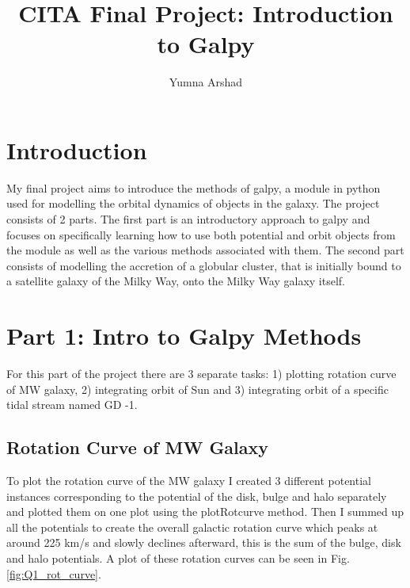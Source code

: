 \documentclass[apj]{emulateapj}
\begin{document}
\title{CITA Final Project: Introduction to Galpy}
 
\author{Yumna Arshad}
 
\section{Introduction}
My final project aims to introduce the methods of galpy, a module in python used for modelling the orbital dynamics of objects in the galaxy. 
The project consists of 2 parts. 
The first part is an introductory approach to galpy and focuses on specifically learning how to use both potential and orbit objects from the module as well as the various methods associated with them.
The second part consists of modelling the accretion of a globular cluster, that is initially bound to a satellite galaxy of the Milky Way, onto the Milky Way galaxy itself. 


\section{Part 1: Intro to Galpy Methods}

For this part of the project there are 3 separate tasks: 1) plotting rotation curve of MW galaxy, 2) integrating orbit of Sun and 3) integrating orbit of a specific tidal stream named GD -1.


\subsection{Rotation Curve of MW Galaxy}
To plot the rotation curve of the MW galaxy I created 3 different potential instances corresponding to the potential of the disk, bulge and halo separately and plotted them on one plot using the plotRotcurve method. Then I summed up all the potentials to create the overall galactic rotation curve which peaks at around 225 km/s and slowly declines afterward, this is the sum of the bulge, disk and halo potentials.
A plot of these rotation curves can be seen in Fig.\ref{fig:Q1_rot_curve}.
\end{document}
